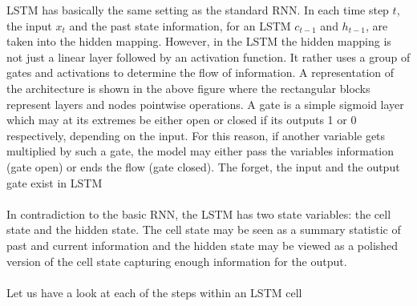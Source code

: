 \documentclass[a4paper,11pt,oneside]{book}
\begin{document}
LSTM has basically the same setting as the standard RNN. In each time step $t$, the input $x_t$ and the past state information, for an LSTM $c_{t-1}$ and $h_{t-1}$, are taken into the hidden mapping. However, in the LSTM the hidden mapping is not just a linear layer followed by an activation function. It rather uses a group of gates and activations to determine the flow of information. A representation of the architecture is shown in the above figure where the rectangular blocks represent layers and nodes pointwise operations.\newline\newline
A gate is a simple sigmoid layer which may at its extremes be either open or closed if its outputs 1 or 0 respectively, depending on the input. For this reason, if another variable gets multiplied by such a gate, the model may either pass the variables information (gate open) or ends the flow (gate closed). The forget, the input and the output gate exist in LSTM\\\\
In contradiction to the basic RNN, the LSTM has two state variables: the cell state and the hidden state. The cell state may be seen as a summary statistic of past and current  information and the hidden state may be viewed as a polished version of the cell state capturing enough information for the output.\\\\
Let us have a look at each of the steps within an LSTM cell
\end{document}

